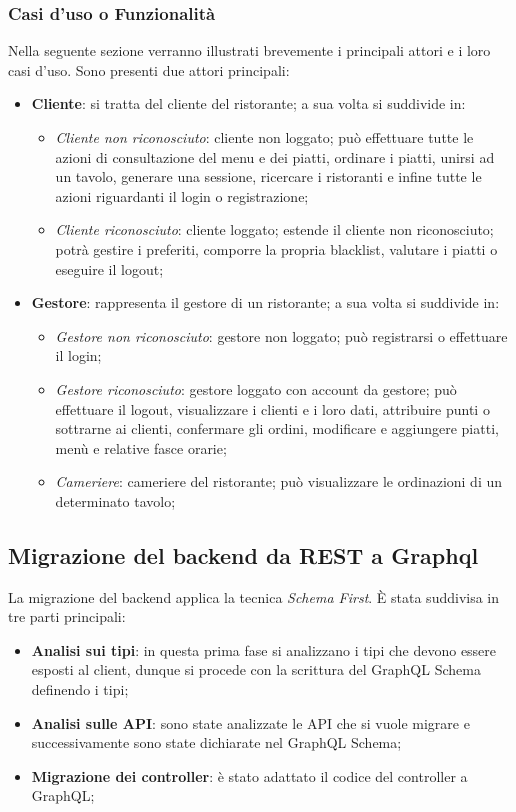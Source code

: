 \subsubsection{Casi d'uso o Funzionalità}
Nella seguente sezione verranno illustrati brevemente i principali attori e i loro casi d'uso. Sono presenti due attori principali:
\begin{itemize}
  \item \textbf{Cliente}: si tratta del cliente del ristorante; a sua volta si suddivide in:
    \begin{itemize}
      \item \textit{Cliente non riconosciuto}: cliente non loggato; può effettuare tutte le azioni di consultazione del menu e dei piatti, ordinare i piatti, unirsi ad un tavolo, generare una sessione, ricercare i ristoranti e infine tutte le azioni riguardanti il login o registrazione;
      \item \textit{Cliente riconosciuto}: cliente loggato; estende il cliente non riconosciuto; potrà gestire i preferiti, comporre la propria blacklist, valutare i piatti o eseguire il logout;
    \end{itemize}
  \item \textbf{Gestore}: rappresenta il gestore di un ristorante; a sua volta si suddivide in:
    \begin{itemize}
      \item \textit{Gestore non riconosciuto}: gestore non loggato; può registrarsi o effettuare il login;
      \item \textit{Gestore riconosciuto}: gestore loggato con account da gestore; può effettuare il logout, visualizzare i clienti e i loro dati, attribuire punti o sottrarne ai clienti, confermare gli ordini, modificare e aggiungere piatti, menù e relative fasce orarie;
      \item \textit{Cameriere}: cameriere del ristorante; può visualizzare le ordinazioni di un determinato tavolo;
    \end{itemize}
\end{itemize}
\subsection{Migrazione del backend da REST a Graphql}
La migrazione del backend applica la tecnica \textit{Schema First}. È stata suddivisa in tre parti principali:
\begin{itemize}
  \item \textbf{Analisi sui tipi}: in questa prima fase si analizzano i tipi che devono essere esposti al client, dunque si procede con la scrittura del GraphQL Schema definendo i tipi;
  \item \textbf{Analisi sulle API}: sono state analizzate le API che si vuole migrare e successivamente sono state dichiarate nel GraphQL Schema;
  \item \textbf{Migrazione dei controller}: è stato adattato il codice del controller a GraphQL;
\end{itemize}
